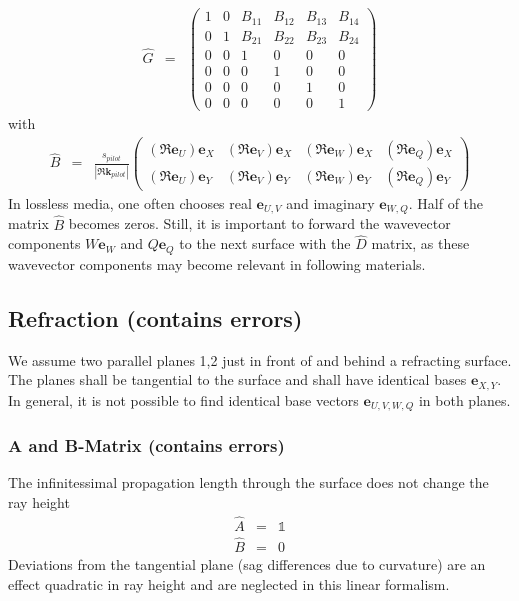 \documentclass[12pt,a4paper,twoside,openright,BCOR10mm,headsepline,titlepage,abstracton,chapterprefix,final]{scrreprt}
\newcommand\Vector[1]{{\mathbf{#1}}}
\newcommand\wavenumber{k}
\newcommand\Wavevector{\Vector{\wavenumber}}
\newcommand\unittensor{\mathds{1}}
\begin{document}
\begin{eqnarray}
 \hat{G} &=&
 \begin{pmatrix}
  1 & 0 & B_{11} & B_{12} & B_{13} & B_{14} \\
  0 & 1 & B_{21} & B_{22} & B_{23} & B_{24} \\
  0 & 0 & 1 & 0 & 0 & 0 \\
  0 & 0 & 0 & 1 & 0 & 0 \\
  0 & 0 & 0 & 0 & 1 & 0 \\
  0 & 0 & 0 & 0 & 0 & 1  
 \end{pmatrix}
 \label{eq:xyuv_propagation_homogeneous}
\end{eqnarray}
with\begin{eqnarray}
 \hat{B} &=&
 \frac{ s_{pilot} }{| \Re \Wavevector_{pilot} |}
 \begin{pmatrix}
  (\Re \Vector{e}_U) \Vector{e}_X & (\Re \Vector{e}_V) \Vector{e}_X & (\Re \Vector{e}_W) \Vector{e}_X & (\Re \Vector{e}_Q) \Vector{e}_X \\
  (\Re \Vector{e}_U) \Vector{e}_Y & (\Re \Vector{e}_V) \Vector{e}_Y & (\Re \Vector{e}_W) \Vector{e}_Y & (\Re \Vector{e}_Q) \Vector{e}_Y
 \end{pmatrix}
\end{eqnarray}
In lossless media, one often chooses real $\Vector{e}_{U,V}$ and imaginary $\Vector{e}_{W,Q}$.
Half of the matrix $\hat{B}$ becomes zeros.
Still, it is important to forward the wavevector components 
$W \Vector{e}_W$ and $Q \Vector{e}_Q$
to the next surface with the $\hat{D}$ matrix, 
as these wavevector components may become relevant in following materials.

\subsection{Refraction (contains errors)}
We assume two parallel planes 1,2 just in front of and behind a refracting surface.
The planes shall be tangential to the surface 
and shall have identical bases $\Vector{e}_{X,Y}$.
In general, it is not possible to find identical base vectors $\Vector{e}_{U,V,W,Q}$ in both planes.

\subsubsection{A and B-Matrix (contains errors)}
The infinitessimal propagation length through the surface does not change the ray height
\begin{eqnarray}
 \hat{A} &=& \unittensor \\
 \hat{B} &=& 0
\end{eqnarray}
Deviations from the tangential plane (sag differences due to curvature) 
are an effect quadratic in ray height and are neglected in this linear formalism.
\end{document}
